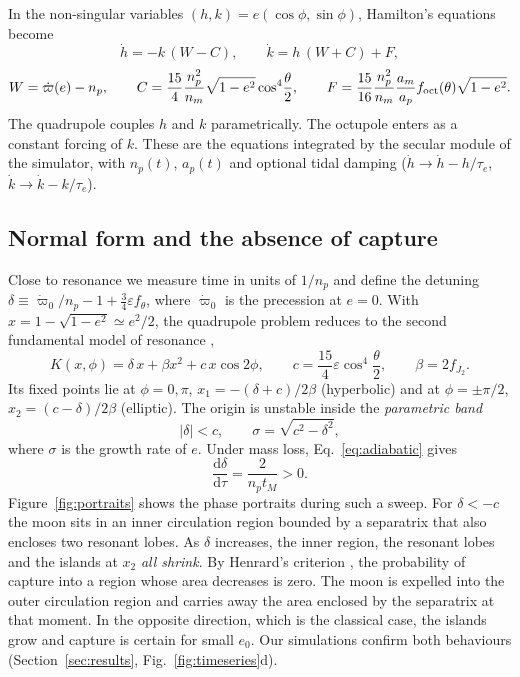 \documentclass[11pt,a4paper]{article}
\newcommand{\eps}{\varepsilon}
\newcommand{\fJ}{f_{J_2}}
\newcommand{\foct}{f_{\rm oct}}
\newcommand{\dd}{\mathrm{d}}
\begin{document}
In the non-singular variables $(h,k)=e(\cos\phi,\sin\phi)$, Hamilton's equations become
\begin{equation}
\dot h=-k\,(W-C),\qquad \dot k=h\,(W+C)+F,
\label{eq:hk}
\end{equation}
\begin{equation}
W=\dot\varpi(e)-n_p,\qquad C=\frac{15}{4}\frac{n_p^2}{n_m}\sqrt{1-e^2}\cos^4\!\frac{\theta}{2},\qquad F=\frac{15}{16}\frac{n_p^2}{n_m}\frac{a_m}{a_p}\foct(\theta)\sqrt{1-e^2}.
\label{eq:WCF}
\end{equation}
The quadrupole couples $h$ and $k$ parametrically. The octupole enters as a constant forcing of $k$. These are the equations integrated by the secular module of the simulator, with $n_p(t)$, $a_p(t)$ and optional tidal damping ($\dot h\to\dot h-h/\tau_e$, $\dot k\to\dot k-k/\tau_e$).

\subsection{Normal form and the absence of capture}

Close to resonance we measure time in units of $1/n_p$ and define the detuning $\delta\equiv\dot\varpi_0/n_p-1+\tfrac34\eps f_\theta$, where $\dot\varpi_0$ is the precession at $e=0$. With $x=1-\sqrt{1-e^2}\simeq e^2/2$, the quadrupole problem reduces to the second fundamental model of resonance \citep{Henrard1982},
\begin{equation}
K(x,\phi)=\delta\,x+\beta x^2+c\,x\cos2\phi,\qquad c=\frac{15}{4}\eps\cos^4\!\frac{\theta}{2},\qquad \beta=2\fJ .
\label{eq:normal}
\end{equation}
Its fixed points lie at $\phi=0,\pi$, $x_1=-(\delta+c)/2\beta$ (hyperbolic) and at $\phi=\pm\pi/2$, $x_2=(c-\delta)/2\beta$ (elliptic). The origin is unstable inside the \emph{parametric band}
\begin{equation}
|\delta|<c,\qquad \sigma=\sqrt{c^2-\delta^2},
\label{eq:band}
\end{equation}
where $\sigma$ is the growth rate of $e$. Under mass loss, Eq.~\eqref{eq:adiabatic} gives
\begin{equation}
\frac{\dd\delta}{\dd\tau}=\frac{2}{n_pt_M}>0 .
\label{eq:deltadot}
\end{equation}
Figure~\ref{fig:portraits} shows the phase portraits during such a sweep. For $\delta<-c$ the moon sits in an inner circulation region bounded by a separatrix that also encloses two resonant lobes. As $\delta$ increases, the inner region, the resonant lobes and the islands at $x_2$ \emph{all shrink}. By Henrard's criterion \citep{Henrard1982,Neishtadt1975}, the probability of capture into a region whose area decreases is zero. The moon is expelled into the outer circulation region and carries away the area enclosed by the separatrix at that moment. In the opposite direction, which is the classical case, the islands grow and capture is certain for small $e_0$. Our simulations confirm both behaviours (Section~\ref{sec:results}, Fig.~\ref{fig:timeseries}d).
\end{document}

